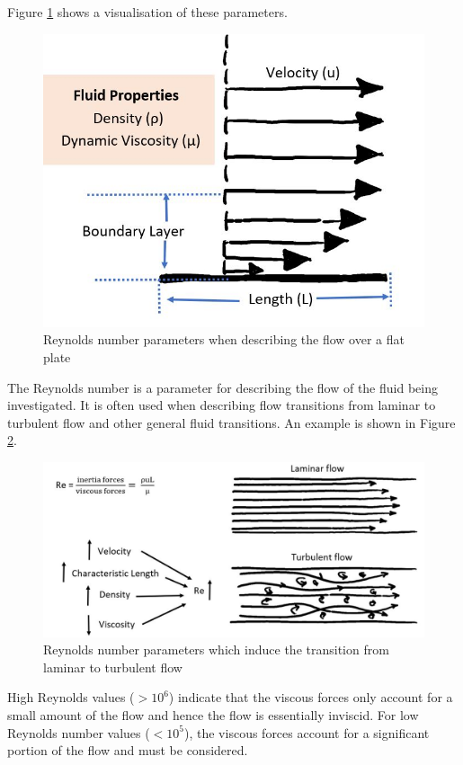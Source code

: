 Figure \ref{fig:Repipe} shows a visualisation of these parameters. 

\begin{figure}[H]
    \centering
    \includegraphics[scale=0.75]{02_Background/Figs/BoundaryLayerUpdated.JPG}
    \caption{Reynolds number parameters when describing the flow over a flat plate}
    \label{fig:Repipe}
\end{figure}

The Reynolds number is a parameter for describing the flow of the fluid being investigated. It is often used when describing flow transitions from laminar to turbulent flow and other general fluid transitions. An example is shown in Figure \ref{fig:Re2}.


\begin{figure}[H]
    \centering
    \includegraphics[scale=0.75]{02_Background/Figs/flowType2.JPG}
   \caption{Reynolds number parameters which induce the transition from laminar to turbulent flow}
    \label{fig:Re2}
\end{figure}


High Reynolds values ($> 10^{6}$) indicate that the viscous forces only account for a small amount of the flow and hence the flow is essentially inviscid. For low Reynolds number values ($< 10^{5}$), the viscous forces account for a significant portion of the flow and must be considered.




